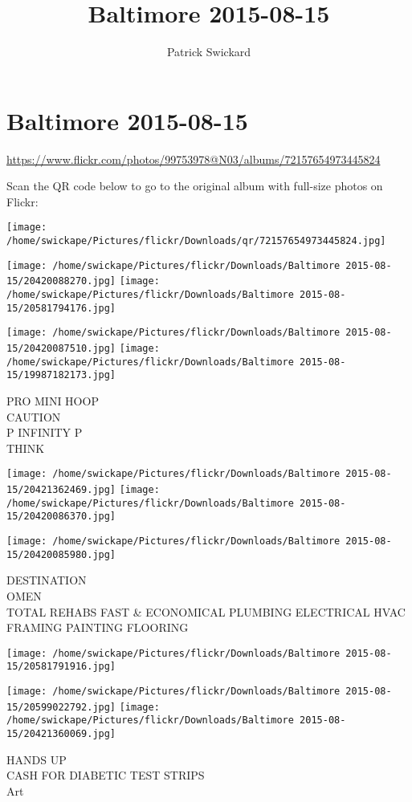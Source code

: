 \documentclass[10pt,letterpaper]{article}
\title{Baltimore 2015-08-15}
\author{Patrick Swickard}
\date{}
\begin{document}
\section*{Baltimore 2015-08-15}

\url{https://www.flickr.com/photos/99753978@N03/albums/72157654973445824}

Scan the QR code below to go to the original album with full-size photos on Flickr:

\texttt{[image: /home/swickape/Pictures/flickr/Downloads/qr/72157654973445824.jpg]}
\pagebreak

\texttt{[image: /home/swickape/Pictures/flickr/Downloads/Baltimore 2015-08-15/20420088270.jpg]}
\texttt{[image: /home/swickape/Pictures/flickr/Downloads/Baltimore 2015-08-15/20581794176.jpg]}

\texttt{[image: /home/swickape/Pictures/flickr/Downloads/Baltimore 2015-08-15/20420087510.jpg]}
\texttt{[image: /home/swickape/Pictures/flickr/Downloads/Baltimore 2015-08-15/19987182173.jpg]}

PRO MINI HOOP\\
CAUTION\\
P INFINITY P\\
THINK
\pagebreak

\texttt{[image: /home/swickape/Pictures/flickr/Downloads/Baltimore 2015-08-15/20421362469.jpg]}
\texttt{[image: /home/swickape/Pictures/flickr/Downloads/Baltimore 2015-08-15/20420086370.jpg]}

\texttt{[image: /home/swickape/Pictures/flickr/Downloads/Baltimore 2015-08-15/20420085980.jpg]}

DESTINATION\\
OMEN\\
TOTAL REHABS FAST \& ECONOMICAL PLUMBING ELECTRICAL HVAC FRAMING PAINTING FLOORING
\pagebreak

\texttt{[image: /home/swickape/Pictures/flickr/Downloads/Baltimore 2015-08-15/20581791916.jpg]}

\vspace{0.25in}
\texttt{[image: /home/swickape/Pictures/flickr/Downloads/Baltimore 2015-08-15/20599022792.jpg]}
\texttt{[image: /home/swickape/Pictures/flickr/Downloads/Baltimore 2015-08-15/20421360069.jpg]}

HANDS UP\\
CASH FOR DIABETIC TEST STRIPS\\
Art
\pagebreak
\end{document}
